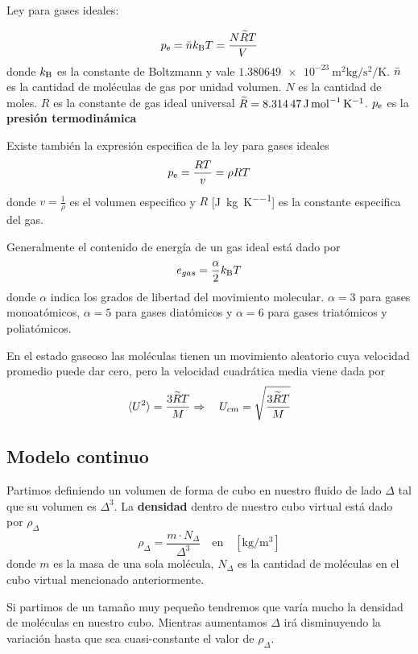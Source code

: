 Ley para gases ideales:

\begin{equation} \label{eq:idealGasesLaw}
    \pe= \moldens \boltzmann T=\frac{N\overtilde{R}T}{V}
\end{equation}
donde $\boltzmann$ es la constante de Boltzmann y vale $\SI{1.380649e-23}{\meter \squared \kilogram \per \second \squared \per \kelvin}$. $\bar{n}$ es la cantidad de moléculas de gas por unidad volumen. $N$ es la cantidad de moles. $R$ es la constante de gas ideal universal $\widetilde{R}=\SI{8,31447}{\joule \per \mole \per \kelvin}$. $\pe$ es la \textbf{presión termodinámica}

Existe también la expresión especifica de la ley para gases ideales
\[
\pe = \frac{RT}{v} = \rho R T
\]
donde $v=\frac{1}{\rho}$ es el volumen especifico y  $R$ [\si{\joule \per \kilogram \per \kelvin}] es la constante especifica del gas.

Generalmente el contenido de energía de un gas ideal está dado por
\begin{equation}
    e_{gas}=\frac{\alpha}{2}\boltzmann T
\end{equation}
donde $\alpha$ indica los grados de libertad del movimiento molecular. $\alpha=3$ para gases monoatómicos, $\alpha=5$ para gases diatómicos y $\alpha=6$ para gases triatómicos y poliatómicos.

En el estado gaseoso las moléculas tienen un movimiento aleatorio cuya velocidad promedio puede dar cero, pero la velocidad cuadrática media viene dada por
\[
\langle U^2 \rangle = \frac{3\widetilde{R}T}{M} \Rightarrow \quad U_{cm}=\sqrt{\frac{3\widetilde{R}T}{M}}
\]

\subsection{Modelo continuo}
Partimos definiendo un volumen de forma de cubo en nuestro fluido de lado $\Delta$ tal que su volumen es $\Delta^3$. La \textbf{densidad}  dentro de nuestro cubo virtual está dado por $\rho_\Delta$ 
\[
\rho_\Delta = \frac{m\cdot N_\Delta}{\Delta^3} \quad \textrm{en} \quad [\si{\kilogram \per \meter \cubed}]
\]
donde $m$ es la masa de una sola molécula, $N_\Delta$ es la cantidad de moléculas en el cubo virtual mencionado anteriormente.

Si partimos de un tamaño muy pequeño tendremos que varía mucho la densidad de moléculas en nuestro cubo. Mientras aumentamos $\Delta$ irá disminuyendo la variación hasta que sea cuasi-constante el valor de $\rho_\Delta$. 

